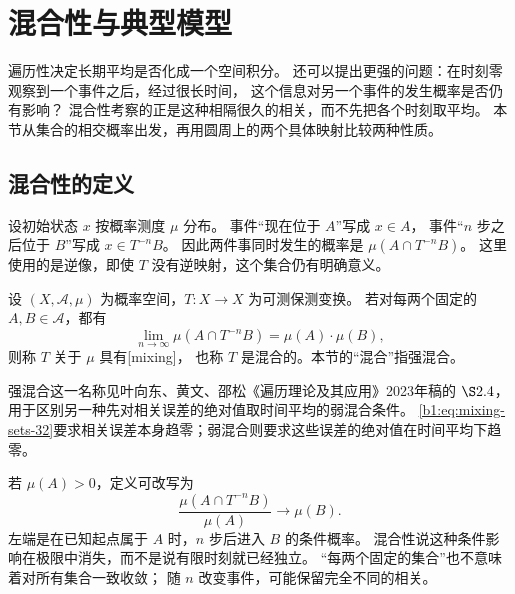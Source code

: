 \section{混合性与典型模型}
\label{b1:sec:3205}

遍历性决定长期平均是否化成一个空间积分。
还可以提出更强的问题：在时刻零观察到一个事件之后，经过很长时间，
这个信息对另一个事件的发生概率是否仍有影响？
混合性考察的正是这种相隔很久的相关，而不先把各个时刻取平均。
本节从集合的相交概率出发，再用圆周上的两个具体映射比较两种性质。

\subsection{混合性的定义}
\label{b1:subsec:320501}

设初始状态 \(x\) 按概率测度 \(\mu\) 分布。
事件“现在位于 \(A\)”写成 \(x\in A\)，
事件“\(n\) 步之后位于 \(B\)”写成 \(x\in T^{-n}B\)。
因此两件事同时发生的概率是 \(\mu(A\cap T^{-n}B)\)。
这里使用的是逆像，即使 \(T\) 没有逆映射，这个集合仍有明确意义。

\begin{definition}[混合性]
\label{b1:def:mixing-32}
设 \((X,\mathcal A,\mu)\) 为概率空间，\(T:X\to X\) 为可测保测变换。
若对每两个固定的 \(A,B\in\mathcal A\)，都有
\begin{equation}
 \lim_{n\to\infty}\mu(A\cap T^{-n}B)=\mu(A)\cdot\mu(B),
 \label{b1:eq:mixing-sets-32}
\end{equation}
则称 \(T\) 关于 \(\mu\) 具有[mixing]，
也称 \(T\) 是混合的。本节的“混合”指强混合。
\end{definition}

强混合这一名称见叶向东、黄文、邵松《遍历理论及其应用》2023年稿的
\(\S2.4\)，用于区别另一种先对相关误差的绝对值取时间平均的弱混合条件。
\eqref{b1:eq:mixing-sets-32}要求相关误差本身趋零；弱混合则要求这些误差的绝对值在时间平均下趋零。

\ProseParagraphBreak

若 \(\mu(A)>0\)，定义可改写为
\[
 \frac{\mu(A\cap T^{-n}B)}{\mu(A)}\longrightarrow\mu(B).
\]
左端是在已知起点属于 \(A\) 时，\(n\) 步后进入 \(B\) 的条件概率。
混合性说这种条件影响在极限中消失，而不是说有限时刻就已经独立。
“每两个固定的集合”也不意味着对所有集合一致收敛；
随 \(n\) 改变事件，可能保留完全不同的相关。

